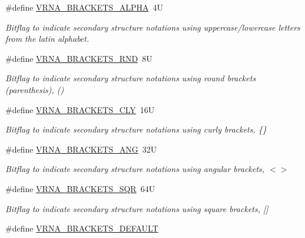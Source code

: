 \begin{DoxyCompactItemize}
\item 
\#define \mbox{\hyperlink{group__struct__utils__dot__bracket_ga7e3f630af8d69bb0e917145aacf2f96d}{V\+R\+N\+A\+\_\+\+B\+R\+A\+C\+K\+E\+T\+S\+\_\+\+A\+L\+P\+HA}}~4U
\begin{DoxyCompactList}\small\item\em Bitflag to indicate secondary structure notations using uppercase/lowercase letters from the latin alphabet. \end{DoxyCompactList}\item 
\#define \mbox{\hyperlink{group__struct__utils__dot__bracket_gac92d5fa7c6625bce2670ece510a24fbd}{V\+R\+N\+A\+\_\+\+B\+R\+A\+C\+K\+E\+T\+S\+\_\+\+R\+ND}}~8U
\begin{DoxyCompactList}\small\item\em Bitflag to indicate secondary structure notations using round brackets (parenthesis), {\ttfamily ()} \end{DoxyCompactList}\item 
\#define \mbox{\hyperlink{group__struct__utils__dot__bracket_gaf41be40e79cb756c4e0bb8edb4d803d2}{V\+R\+N\+A\+\_\+\+B\+R\+A\+C\+K\+E\+T\+S\+\_\+\+C\+LY}}~16U
\begin{DoxyCompactList}\small\item\em Bitflag to indicate secondary structure notations using curly brackets, {\ttfamily \{\}} \end{DoxyCompactList}\item 
\#define \mbox{\hyperlink{group__struct__utils__dot__bracket_ga863e03f7f73f10fc9bbcbefbdda4bec8}{V\+R\+N\+A\+\_\+\+B\+R\+A\+C\+K\+E\+T\+S\+\_\+\+A\+NG}}~32U
\begin{DoxyCompactList}\small\item\em Bitflag to indicate secondary structure notations using angular brackets, {\ttfamily $<$$>$} \end{DoxyCompactList}\item 
\#define \mbox{\hyperlink{group__struct__utils__dot__bracket_ga60525d61d7496eeea490a37f3d6bf757}{V\+R\+N\+A\+\_\+\+B\+R\+A\+C\+K\+E\+T\+S\+\_\+\+S\+QR}}~64U
\begin{DoxyCompactList}\small\item\em Bitflag to indicate secondary structure notations using square brackets, {\ttfamily \mbox{[}\mbox{]}} \end{DoxyCompactList}\item 
\#define \mbox{\hyperlink{group__struct__utils__dot__bracket_ga559ebf76b1b289f85309f4206e99aa1a}{V\+R\+N\+A\+\_\+\+B\+R\+A\+C\+K\+E\+T\+S\+\_\+\+D\+E\+F\+A\+U\+LT}}

\end{DoxyCompactItemize}
